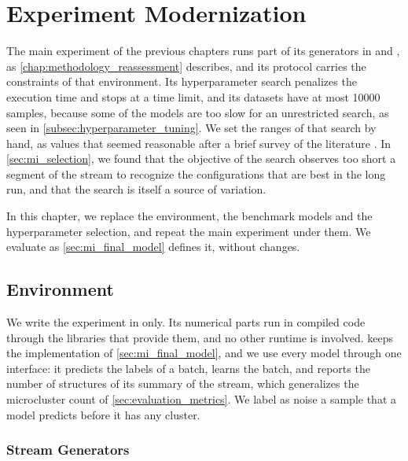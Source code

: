 \chapter{Experiment Modernization}
\label{chap:modernization}

The main experiment of the previous chapters runs part of its generators in  and , as \cref{chap:methodology_reassessment} describes, and its protocol carries the constraints of that environment. Its hyperparameter search penalizes the execution time and stops at a time limit, and its datasets have at most 10000 samples, because some of the models are too slow for an unrestricted search, as seen in \cref{subsec:hyperparameter_tuning}. We set the ranges of that search by hand, as values that seemed reasonable after a brief survey of the literature \cite{cao2006density,aggarwal2003framework,hyde2017fully,ackermann2012streamkmpp,bezerra2016tedacloud,bezerra2020autocloud}. In \cref{sec:mi_selection}, we found that the objective of the search observes too short a segment of the stream to recognize the configurations that are best in the long run, and that the search is itself a source of variation.

In this chapter, we replace the environment, the benchmark models and the hyperparameter selection, and repeat the main experiment under them. We evaluate \MicroTEDAClusPlus as \cref{sec:mi_final_model} defines it, without changes.

\section{Environment}
\label{sec:mod_environment}

We write the experiment in  only. Its numerical parts run in compiled code through the libraries that provide them, and no other runtime is involved. \MicroTEDAClusPlus keeps the implementation of \cref{sec:mi_final_model}, and we use every model through one interface: it predicts the labels of a batch, learns the batch, and reports the number of structures of its summary of the stream, which generalizes the microcluster count of \cref{sec:evaluation_metrics}. We label as noise a sample that a model predicts before it has any cluster.

\subsection{Stream Generators}
\label{subsec:mod_generators}


